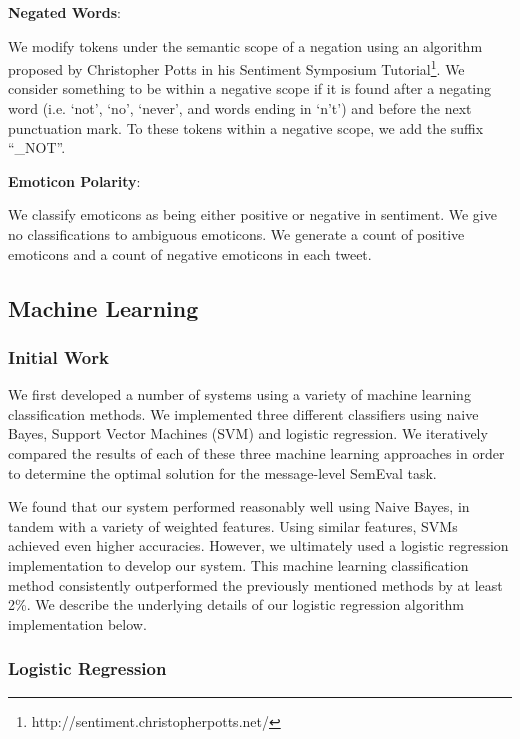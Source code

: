 \documentclass[11pt,letterpaper]{article}
\begin{document}
\vspace{3 mm}
\noindent
{\bf Negated Words}:

We modify tokens under the semantic scope of a negation using an algorithm proposed by Christopher Potts in his Sentiment Symposium Tutorial\footnote{http://sentiment.christopherpotts.net/}. We consider something to be within a negative scope if it is found after a negating word (i.e. ‘not’, ‘no’, ‘never’, and words ending in ‘n’t’) and before the next punctuation mark. To these tokens within a negative scope, we add the suffix “\_NOT”.

\vspace{3 mm}
\noindent
{\bf Emoticon Polarity}:

We classify emoticons as being either positive or negative in sentiment. We give no classifications to ambiguous emoticons. We generate a count of positive emoticons and a count of negative emoticons in each tweet.

\subsection{Machine Learning}
\label{ssec:machinelearning}

\subsubsection{Initial Work}

We first developed a number of systems using a variety of machine learning classification methods. We implemented three different classifiers using naive Bayes, Support Vector Machines (SVM) and logistic regression. We iteratively compared the results of each of these three machine learning approaches in order to determine the optimal solution for the message-level SemEval task. 

We found that our system performed reasonably well using Naive Bayes, in tandem with a variety of weighted features. Using similar features, SVMs achieved even higher accuracies. However, we ultimately used a logistic regression implementation to develop our system. This machine learning classification method consistently outperformed the previously mentioned methods by at least 2\%. We describe the underlying details of our logistic regression algorithm implementation below.

\subsubsection{Logistic Regression}
\end{document}
